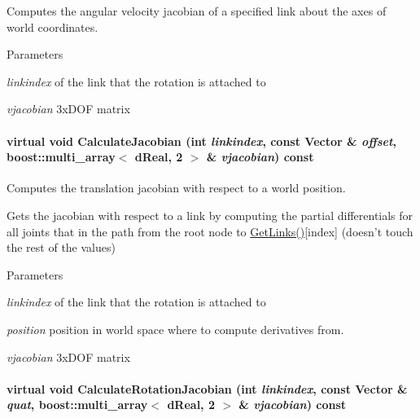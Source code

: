 Computes the angular velocity jacobian of a specified link about the axes of world coordinates. 


\begin{DoxyParams}{Parameters}
\item[{\em linkindex}]of the link that the rotation is attached to \item[{\em vjacobian}]3xDOF matrix \end{DoxyParams}
\hypertarget{classOpenRAVE_1_1KinBody_a7fd6178241c4b8c8bb8a9d9b5f92f8cc}{
\paragraph[{CalculateJacobian}]{\setlength{\rightskip}{0pt plus 5cm}virtual void CalculateJacobian (int {\em linkindex}, \/  const Vector \& {\em offset}, \/  boost::multi\_\-array$<$ dReal, 2 $>$ \& {\em vjacobian}) const}\hfill}
\label{classOpenRAVE_1_1KinBody_a7fd6178241c4b8c8bb8a9d9b5f92f8cc}


Computes the translation jacobian with respect to a world position. 

Gets the jacobian with respect to a link by computing the partial differentials for all joints that in the path from the root node to \hyperlink{classOpenRAVE_1_1KinBody_a32ba11c03aabb873b3e503c8e5b93e53}{GetLinks()}\mbox{[}index\mbox{]} (doesn't touch the rest of the values) 
\begin{DoxyParams}{Parameters}
\item[{\em linkindex}]of the link that the rotation is attached to \item[{\em position}]position in world space where to compute derivatives from. \item[{\em vjacobian}]3xDOF matrix \end{DoxyParams}
\hypertarget{classOpenRAVE_1_1KinBody_a4223d26feefc25a2d8b7e0abdb30e551}{
\paragraph[{CalculateRotationJacobian}]{\setlength{\rightskip}{0pt plus 5cm}virtual void CalculateRotationJacobian (int {\em linkindex}, \/  const Vector \& {\em quat}, \/  boost::multi\_\-array$<$ dReal, 2 $>$ \& {\em vjacobian}) const}\hfill}
\label{classOpenRAVE_1_1KinBody_a4223d26feefc25a2d8b7e0abdb30e551}


